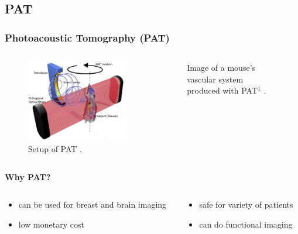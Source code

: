 \documentclass[9pt]{beamer}
\begin{document}
\subsection{PAT}
\begin{frame}
\frametitle{Photoacoustic Tomography  (PAT)}
\begin{columns}
	 \begin{column}{.5\textwidth}
	 	\begin{figure}
 			\includegraphics[width = \linewidth]{mouseSetup.png}
 			\caption{Setup of PAT \footnotemark.}
		\end{figure}
 	\end{column}
  	\begin{column}{.5\textwidth}
		\begin{figure}
 			\caption{Image of a mouse's vascular system produced with PAT$^1$ . }
		\end{figure}
	\end{column}
\end{columns}
\vspace{-2mm}
\hspace{-4mm}\textbf{Why PAT?}
\begin{columns}
	 \begin{column}{.6\textwidth}
                \begin{itemize}
                \item can be used for breast and brain imaging
                \item low monetary cost
                \end{itemize}
 	\end{column}
  	\begin{column}{.5\textwidth}
	      \begin{itemize}
                \item safe for variety of patients
                \item can do functional imaging
                \end{itemize}
	\end{column}
\end{columns}


\end{frame}
\end{document}
